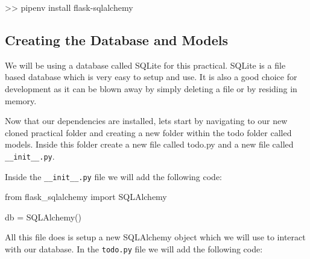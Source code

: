 \documentclass{csse4400}
\begin{document}
\begin{code}[language=bash,numbers=none]{}
  >> pipenv install flask-sqlalchemy
\end{code}

\subsection{Creating the Database and Models}

We will be using a database called SQLite for this practical. SQLite is a file based database which is very easy to setup and use. It is also a good choice for development as it can be blown away by simply deleting a file or by residing in memory.

Now that our dependencies are installed, lets start by navigating to our new cloned practical folder and creating a new folder within the todo folder called models. Inside this folder create a new file called todo.py and a new file called \texttt{\_\_init\_\_.py}.

Inside the \texttt{\_\_init\_\_.py} file we will add the following code:

\begin{code}[language=python,numbers=none]{}
  from flask_sqlalchemy import SQLAlchemy

  db = SQLAlchemy()
\end{code}

All this file does is setup a new SQLAlchemy object which we will use to interact with our database. In the \texttt{todo.py} file we will add the following code:
\end{document}

